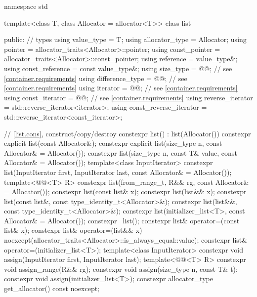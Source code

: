 \begin{codeblock}
namespace std {
  template<class T, class Allocator = allocator<T>>
  class list {
  public:
    // types
    using value_type             = T;
    using allocator_type         = Allocator;
    using pointer                = allocator_traits<Allocator>::pointer;
    using const_pointer          = allocator_traits<Allocator>::const_pointer;
    using reference              = value_type&;
    using const_reference        = const value_type&;
    using size_type              = @@; // see \ref{container.requirements}
    using difference_type        = @@; // see \ref{container.requirements}
    using iterator               = @@; // see \ref{container.requirements}
    using const_iterator         = @@; // see \ref{container.requirements}
    using reverse_iterator       = std::reverse_iterator<iterator>;
    using const_reverse_iterator = std::reverse_iterator<const_iterator>;

    // \ref{list.cons}, construct/copy/destroy
    constexpr list() : list(Allocator()) { }
    constexpr explicit list(const Allocator&);
    constexpr explicit list(size_type n, const Allocator& = Allocator());
    constexpr list(size_type n, const T& value, const Allocator& = Allocator());
    template<class InputIterator>
      constexpr list(InputIterator first, InputIterator last, const Allocator& = Allocator());
    template<@@<T> R>
      constexpr list(from_range_t, R&& rg, const Allocator& = Allocator());
    constexpr list(const list& x);
    constexpr list(list&& x);
    constexpr list(const list&, const type_identity_t<Allocator>&);
    constexpr list(list&&, const type_identity_t<Allocator>&);
    constexpr list(initializer_list<T>, const Allocator& = Allocator());
    constexpr ~list();
    constexpr list& operator=(const list& x);
    constexpr list& operator=(list&& x)
      noexcept(allocator_traits<Allocator>::is_always_equal::value);
    constexpr list& operator=(initializer_list<T>);
    template<class InputIterator>
      constexpr void assign(InputIterator first, InputIterator last);
    template<@@<T> R>
      constexpr void assign_range(R&& rg);
    constexpr void assign(size_type n, const T& t);
    constexpr void assign(initializer_list<T>);
    constexpr allocator_type get_allocator() const noexcept;

}}
\end{codeblock}
